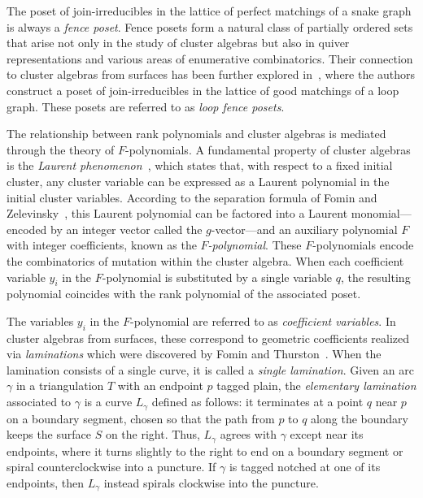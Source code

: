 \documentclass{article}
\theoremstyle{remark}
\begin{document}
The poset of join-irreducibles in the lattice of perfect matchings of a snake graph is always a \emph{fence poset}. Fence posets form a natural class of partially ordered sets that arise not only in the study of cluster algebras but also in quiver representations and various areas of enumerative combinatorics. Their connection to cluster algebras from surfaces has been further explored in~\cite{ouguz2024cluster, pilaud2023posets}, where the authors construct a poset of join-irreducibles in the lattice of good matchings of a loop graph. These posets are referred to as \emph{loop fence posets}.


The relationship between rank polynomials and cluster algebras is mediated through the theory of $F$-polynomials. A fundamental property of cluster algebras is the \emph{Laurent phenomenon}~\cite{FZ2002}, which states that, with respect to a fixed initial cluster, any cluster variable can be expressed as a Laurent polynomial in the initial cluster variables. According to the separation formula of Fomin and Zelevinsky~\cite{FZ2007}, this Laurent polynomial can be factored into a Laurent monomial—encoded by an integer vector called the $g$-vector—and an auxiliary polynomial $F$ with integer coefficients, known as the \emph{$F$-polynomial}. These $F$-polynomials encode the combinatorics of mutation within the cluster algebra. When each coefficient variable $y_i$ in the $F$-polynomial is substituted by a single variable $q$, the resulting polynomial coincides with the rank polynomial of the associated poset.

The variables \(y_i\) in the \(F\)-polynomial are referred to as \emph{coefficient variables}. In cluster algebras from surfaces, these correspond to geometric coefficients realized via \emph{laminations} which were discovered by Fomin and Thurston~\cite{FT-II}. When the lamination consists of a single curve, it is called a \emph{single lamination}. Given an arc $\gamma$ in a triangulation \(T\) with an endpoint \(p\) tagged plain, the \emph{elementary lamination} associated to $\gamma$ is a curve \(L_\gamma\) defined as follows: it terminates at a point \(q\) near \(p\) on a boundary segment, chosen so that the path from \(p\) to \(q\) along the boundary keeps the surface \(S\) on the right. Thus, \(L_\gamma\) agrees with \(\gamma\) except near its endpoints, where it turns slightly to the right to end on a boundary segment or spiral counterclockwise into a puncture. If \(\gamma\) is tagged notched at one of its endpoints, then \(L_\gamma\) instead spirals clockwise into the puncture.
\end{document}
